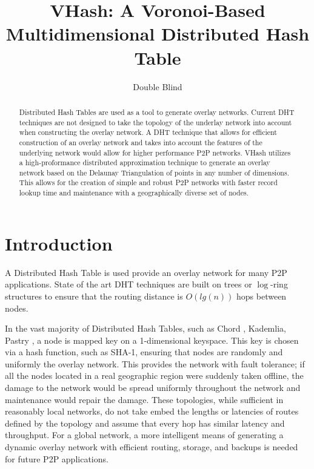 \documentclass{IEEEtran}
\title{VHash: A Voronoi-Based Multidimensional Distributed Hash Table}
\author{Double Blind}
\date{} %
\begin{document}
\maketitle

\begin{abstract}
Distributed Hash Tables are used as a tool to generate overlay networks.
Current DHT techniques are not designed to take the topology of the underlay network into account when constructing the overlay network.
A DHT technique that allows for efficient construction of an overlay network  and takes into account the features of the underlying network would allow for higher performance P2P networks.
VHash utilizes a high-proformance distributed approximation technique to generate an overlay network based on the Delaunay Triangulation of points in any number of dimensions.
This allows for the creation of simple and robust P2P networks with faster record lookup time and maintenance with a geographically diverse set of nodes.


\end{abstract}

\section{Introduction}
A Distributed Hash Table is used provide an overlay network for many P2P applications. State of the art DHT techniques are built on trees or $\log$-ring structures to ensure that the routing distance is $O(lg(n))$ hops between nodes. 

In the vast majority of Distributed Hash Tables, such as Chord \cite{chord}, Kademlia\cite{kademlia}, Pastry \cite{pastry}, a node is mapped key on a 1-dimensional keyspace.  This key is chosen via a hash function, such as SHA-1, ensuring that nodes are randomly and uniformly the overlay network.
This provides the network with fault tolerance; if all the nodes located in a real geographic region were suddenly taken offline, the damage to the network would be spread uniformly throughout the network and maintenance would repair the damage.  
These topologies, while sufficient in reasonably local networks, do not take embed the lengths or latencies of routes defined by the topology and assume that every hop has similar latency and throughput. For a global network, a more intelligent means of generating a dynamic overlay network with efficient routing, storage, and backups is needed for future P2P applications.
 
\end{document}
